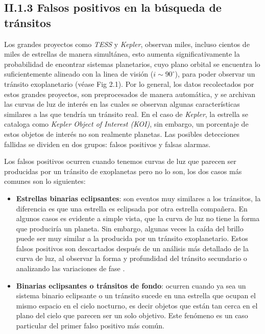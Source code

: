 \subsection*{II.1.3 Falsos positivos en la búsqueda de tránsitos}

Los grandes proyectos como \textit{TESS} y \textit{Kepler}, observan miles, incluso cientos de miles de estrellas de manera simultánea, esto aumenta significativamente la probabilidad de encontrar sistemas planetarios, cuyo plano orbital se encuentra lo suficientemente alineado con la linea de visión ($i\sim 90^{\circ}$), para poder observar un tránsito exoplanetario (véase Fig 2.1). Por lo general, los datos recolectados por estos grandes proyectos, son preprocesados de manera automática, y se archivan las curvas de luz de interés en las cuales se observan algunas características similares a las que tendría un tránsito real. En el caso de \textit{Kepler}, la estrella se cataloga como \textit{Kepler Object of Interest (KOI)}, sin embargo, un porcentaje de estos objetos de interés no son realmente planetas. Las posibles detecciones fallidas se dividen en dos grupos: falsos positivos y falsas alarmas.

Los falsos positivos ocurren cuando tenemos curvas de luz que parecen ser producidas por un tránsito de exoplanetas pero no lo son, los dos casos más comunes son lo siguientes:

\begin{itemize}
\item \textbf{Estrellas binarias eclipsantes}: son eventos muy similares a los tránsitos, la diferencia es que una estrella es eclipsada por otra estrella compañera. En algunos casos es evidente a simple vista, que la curva de luz no tiene la forma que produciría un planeta. Sin embargo, algunas veces la caída del brillo puede ser muy similar a la producida por un tránsito exoplanetario. Estos falsos positivos son descartados después de un análisis más detallado de la curva de luz, al observar la forma y profundidad del tránsito secundario o analizando las variaciones de fase \citep{bryson2017kepler}.
\item \textbf{Binarias eclipsantes o tránsitos de fondo}: ocurren cuando ya sea un sistema binario eclipsante o un tránsito sucede en una estrella que ocupan el mismo espacio en el cielo nocturno, es decir objetos que están tan cerca en el plano del cielo que parecen ser un solo objetivo. Este fenómeno es un caso particular del primer falso positivo más común.
\end{itemize}

